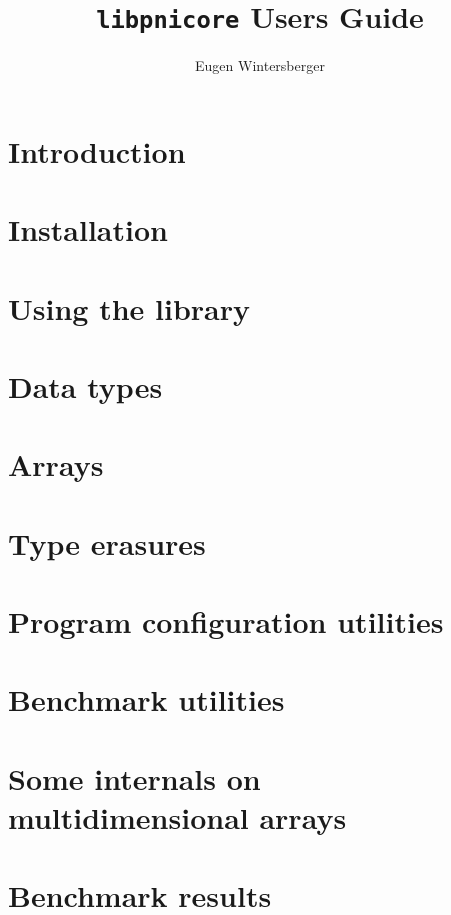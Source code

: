 \documentclass[a4paper,draft]{scrbook}
\title{{\Huge{\tt libpnicore} Users Guide}}
\author{Eugen Wintersberger}
\begin{document}
\maketitle
\tableofcontents

\chapter{Introduction}\label{chapter:introduction}

\FloatBarrier

\chapter{Installation}\label{chapter:installation}

\FloatBarrier

\chapter{Using the library}\label{chapter:using_library}

\FloatBarrier 

\chapter{Data types}\label{chapter:data_types}

\FloatBarrier

\chapter{Arrays}\label{chapter:arrays}

\FloatBarrier

\chapter{Type erasures}\label{chapter:type_erasures}

\FloatBarrier

\chapter{Program configuration utilities}\label{chapter:configuration}

\FloatBarrier

\chapter{Benchmark utilities}\label{chapter:benchmark}
\FloatBarrier

\appendix
\chapter{Some internals on multidimensional arrays}

\FloatBarrier

\chapter{Benchmark results}

\FloatBarrier


\end{document}
